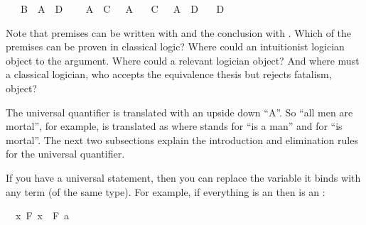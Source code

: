 \begin{isabellebody}
\ \ \ {\isachardoublequoteopen}{\isacharparenleft}B\ {\isasymlongrightarrow}\ A{\isacharparenright}\ {\isasymlongrightarrow}\ D{\isachardoublequoteclose}\isanewline
\ \ \ {\isachardoublequoteopen}{\isasymnot}\ A\ {\isasymlongrightarrow}\ C\ {\isasymlongrightarrow}\ {\isasymnot}\ A{\isachardoublequoteclose}\isanewline
\ \ \ {\isachardoublequoteopen}{\isacharparenleft}C\ {\isasymlongrightarrow}\ {\isasymnot}\ A{\isacharparenright}\ {\isasymlongrightarrow}\ D{\isachardoublequoteclose}\isanewline
\ \ \ {\isachardoublequoteopen}D{\isachardoublequoteclose}%
\isadelimproof
\ %
\endisadelimproof
%
\isatagproof
{}\isamarkupfalse%
%
\endisatagproof
{\isafoldproof}%
%
\isadelimproof
%
\endisadelimproof
%
\begin{isamarkuptext}%
Note that premises can be written with  and the conclusion with .
Which of the premises can be proven in classical logic? Where could an intuitionist logician object to
the argument. Where could a relevant logician object? And where must a classical logician, who accepts
the equivalence thesis but rejects fatalism, object?%
\end{isamarkuptext}\isamarkuptrue%
%
\isamarkuptrue%
%
\isamarkuptrue%
%
\begin{isamarkuptext}%
The universal quantifier is translated with an upside down ``A''. So ``all men are mortal'',
for example, is translated as  where  stands for ``is a man''
and  for ``is mortal''. The next two subsections explain the introduction and elimination
rules for the universal quantifier.%
\end{isamarkuptext}\isamarkuptrue%
%
\isamarkuptrue%
%
\begin{isamarkuptext}%
If you have a universal statement, then you can replace the variable it binds with any term 
(of the same type). For example, if everything is an  then  is an :%
\end{isamarkuptext}\isamarkuptrue%
\isamarkupfalse%
\ {\isachardoublequoteopen}{\isacharparenleft}{\isasymforall}\ x{\isachardot}\ F\ x{\isacharparenright}\ {\isasymlongrightarrow}\ F\ a{\isachardoublequoteclose}\isanewline
%
\isadelimproof
%
\endisadelimproof
%
\isatagproof
{}\isamarkupfalse%

\end{isabellebody}
